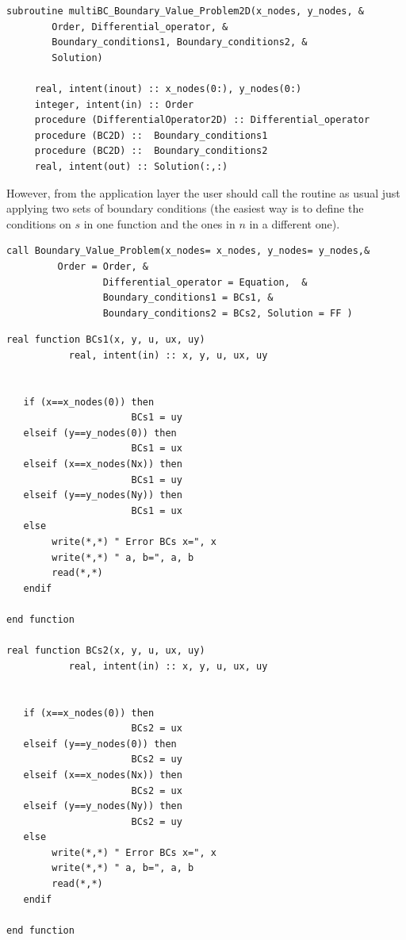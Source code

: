 \begin{blueframed}
\begin{lstlisting}
subroutine multiBC_Boundary_Value_Problem2D(x_nodes, y_nodes, &
		Order, Differential_operator, &
		Boundary_conditions1, Boundary_conditions2, &
		Solution)

     real, intent(inout) :: x_nodes(0:), y_nodes(0:)
     integer, intent(in) :: Order
     procedure (DifferentialOperator2D) :: Differential_operator
     procedure (BC2D) ::  Boundary_conditions1
     procedure (BC2D) ::  Boundary_conditions2
     real, intent(out) :: Solution(:,:)

\end{lstlisting}
\end{blueframed}

However, from the application layer the user should call the routine as usual
just applying two sets of boundary conditions (the easiest way is to define the
conditions on $s$ in one function and the ones in $n$ in a different one).\\

\begin{blueframed}
\begin{lstlisting}
call Boundary_Value_Problem(x_nodes= x_nodes, y_nodes= y_nodes,&
		 Order = Order, &
                 Differential_operator = Equation,  &
                 Boundary_conditions1 = BCs1, &
                 Boundary_conditions2 = BCs2, Solution = FF )
\end{lstlisting}
\end{blueframed}


\begin{blueframed}
\begin{lstlisting}
real function BCs1(x, y, u, ux, uy)
           real, intent(in) :: x, y, u, ux, uy


   if (x==x_nodes(0)) then
                      BCs1 = uy
   elseif (y==y_nodes(0)) then
                      BCs1 = ux
   elseif (x==x_nodes(Nx)) then
                      BCs1 = uy
   elseif (y==y_nodes(Ny)) then
                      BCs1 = ux
   else
        write(*,*) " Error BCs x=", x
        write(*,*) " a, b=", a, b
        read(*,*)
   endif

end function

real function BCs2(x, y, u, ux, uy)
           real, intent(in) :: x, y, u, ux, uy


   if (x==x_nodes(0)) then
                      BCs2 = ux
   elseif (y==y_nodes(0)) then
                      BCs2 = uy
   elseif (x==x_nodes(Nx)) then
                      BCs2 = ux
   elseif (y==y_nodes(Ny)) then
                      BCs2 = uy
   else
        write(*,*) " Error BCs x=", x
        write(*,*) " a, b=", a, b
        read(*,*)
   endif

end function
\end{lstlisting}
\end{blueframed}

